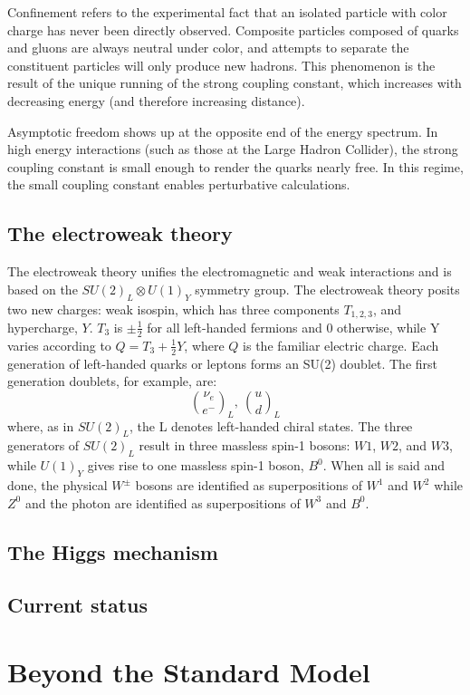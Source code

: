 Confinement refers to the experimental fact that an isolated particle with color charge has never been directly observed. Composite particles composed of quarks and gluons are always neutral under color, and attempts to separate the constituent particles will only produce new hadrons. This phenomenon is the result of the unique running of the strong coupling constant, which increases with decreasing energy (and therefore increasing distance).   

Asymptotic freedom shows up at the opposite end of the energy spectrum. In high energy interactions (such as those at the Large Hadron Collider), the strong coupling constant is small enough to render the quarks nearly free. In this regime, the small coupling constant enables perturbative calculations. 

\subsection{The electroweak theory}
The electroweak theory unifies the electromagnetic and weak interactions and is based on the $SU(2)_{L} \otimes U(1)_{Y}$ symmetry group. The electroweak theory posits two new charges: weak isospin, which has three components $T_{1,2,3}$, and hypercharge, $Y$. $T_{3}$ is $\pm\frac{1}{2}$ for all left-handed fermions and 0 otherwise, while Y varies according to $Q=T_{3}+\frac{1}{2}Y$, where $Q$ is the familiar electric charge. Each generation of left-handed quarks or leptons forms an SU(2) doublet. The first generation doublets, for example, are:
\begin{equation}
    \binom{\nu_{e}}{e^{-}}_{L},\ \binom{u}{d}_{L}
\end{equation}
where, as in $SU(2)_{L}$, the L denotes left-handed chiral states. The three generators of $SU(2)_{L}$ result in three massless spin-1 bosons: $W1$, $W2$, and $W3$, while $U(1)_{Y}$ gives rise to one massless spin-1 boson, $B^{0}$. When all is said and done, the physical $W^{\pm}$ bosons are identified as superpositions of $W^{1}$ and $W^{2}$ while $Z^0$ and the photon are identified as superpositions of $W^{3}$ and $B^{0}$.

\subsection{The Higgs mechanism}

\subsection{Current status}





\section{Beyond the Standard Model}

